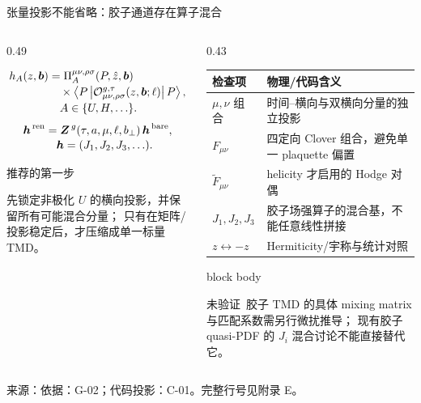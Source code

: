\documentclass[UTF8,aspectratio=169,11pt]{ctexbeamer}
\newcommand{\source}[1]{%
  \par\vspace{0.05em}%
  {\raggedright\scriptsize\color{muted}来源：#1\par}}
\newcommand{\unverified}{\textcolor{warning}{未验证}}
\begin{document}
\begin{frame}[t]{张量投影不能省略：胶子通道存在算子混合}
  \begin{columns}[T,totalwidth=\textwidth]
    \begin{column}{0.49\textwidth}
      {\footnotesize
      \begin{align*}
        h_{A}(z,\boldsymbol b)
        &=\Pi_{A}^{\mu\nu,\rho\sigma}(P,\hat z,\boldsymbol b)\\[-0.2em]
        &\quad\times\left\langle P\left|
        {\cal O}^{g,\tau}_{\mu\nu,\rho\sigma}(z,\boldsymbol b;\ell)
        \right|P\right\rangle,\\[-0.2em]
        &\quad A\in\{U,H,\ldots\}.
      \end{align*}
      \[
      \begin{aligned}
        \boldsymbol h^{\,\rm ren}
        &=\boldsymbol Z^{\,g}(\tau,a,\mu,\ell,b_\perp)\,
        \boldsymbol h^{\,\rm bare},\\[-0.2em]
        &\hspace{1.0em}\boldsymbol h=(J_1,J_2,J_3,\ldots).
      \end{aligned}
      \]
      \par}
      \begin{block}{推荐的第一步}
        {\footnotesize
        先锁定非极化 $U$ 的横向投影，并保留所有可能混合分量；
        只有在矩阵/投影稳定后，才压缩成单一标量 TMD。\par}
      \end{block}
    \end{column}
    \begin{column}{0.43\textwidth}
      {\footnotesize
      \begin{tabularx}{\linewidth}{@{}lX@{}}
        \toprule
        检查项 & 物理/代码含义 \\
        \midrule
        $\mu,\nu$ 组合 & 时间--横向与双横向分量的独立投影\\
        $F_{\mu\nu}$ & 四定向 Clover 组合，避免单一 plaquette 偏置\\
        $\widetilde F_{\mu\nu}$ & helicity 才启用的 Hodge 对偶\\
        $J_1,J_2,J_3$ & 胶子场强算子的混合基，不能任意线性拼接\\
        $z\leftrightarrow-z$ & Hermiticity/宇称与统计对照\\
        \bottomrule
      \end{tabularx}\par}
      \vspace{0.18em}
      \begin{beamercolorbox}[wd=\linewidth,sep=0.5em,rounded=true]{block body}
        {\footnotesize
        \unverified\ 胶子 TMD 的具体 mixing matrix 与匹配系数需另行微扰推导；
        现有胶子 quasi-PDF 的 $J_i$ 混合讨论不能直接替代它。\par}
      \end{beamercolorbox}
    \end{column}
  \end{columns}
  \source{依据：G-02；代码投影：C-01。完整行号见附录 E。}
\end{frame}
\end{document}
